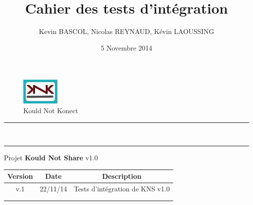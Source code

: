 \documentclass[10pt,a4paper,landscape]{report}
\author{Kevin BASCOL, Nicolas REYNAUD, Kévin LAOUSSING}
\title{Cahier des tests d'intégration}
\date{5 Novembre 2014}
\begin{document}
\makeatletter
	\begin{titlepage}
	
	\begin{figure}
		\begin{minipage}[c]{.46\linewidth}
		\end{minipage} \hfill
		\begin{minipage}[c]{.20\linewidth}
			\begin{center}
				\includegraphics{../Logo/logoKNK.jpg}\\
				{\large Kould Not Konect}
			\end{center}
		\end{minipage}
	\vspace{1cm}
	\end{figure}
	
	\centering
		{
		\hrule height 2pt
		\vspace{0.7cm}
		\Huge \textbf{\@title}}\\
		\vspace{0.7cm}
		\hrule height 2pt
		\vspace{1.5cm}
		{\LARGE  Projet \textbf{Kould Not Share} v1.0}
		
		\vfill
		
		\begin{tabular}{|c|c|c|}
			\hline
			Version & Date & Description\\
			\hline
			v.1 & 22/11/14 & Tests d'intégration de KNS v1.0\\
			\hline
			 & & \\
			\hline
			 & & \\
			\hline
		\end{tabular}\\
		\vspace{1cm}
		\@author\\
		\end{titlepage}
\makeatother
\setcounter{secnumdepth}{5}
\setcounter{tocdepth}{5}
\renewcommand{\contentsname}{Sommaire}
\begingroup\makeatletter
\def\@makeschapterhead#1{%
  {\parindent \z@ \raggedright
    \normalfont
    \interlinepenalty\@M
    \Huge \bfseries  #1\par\nobreak
    \vskip 20pt%
  }}\makeatother
\tableofcontents
\endgroup
\thispagestyle{empty}
\setcounter{page}{0}
\newpage
\end{document}
